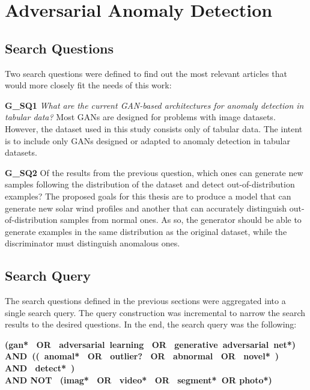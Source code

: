 \section{Adversarial Anomaly Detection}\label{sec:sota_anomaly_detection}

\subsection{Search Questions}\label{sec:gan_search_questions}
Two search questions were defined to find out the most relevant articles that would more closely fit the needs of this work:


\noindent\textbf{G\_SQ1} \textit{What are the current GAN-based architectures for anomaly detection in tabular data?} Most GANs are designed for problems with image datasets. However, the dataset used in this study consists only of tabular data. The intent is to include only GANs designed or adapted to anomaly detection in tabular datasets.

\noindent\textbf{G\_SQ2} Of the results from the previous question, which ones can generate new samples following the distribution of the dataset and detect out-of-distribution examples? The proposed goals for this thesis are to produce a model that can generate new solar wind profiles and another that can accurately distinguish out-of-distribution samples from normal ones. As so, the generator should be able to generate examples in the same distribution as the original dataset, while the discriminator must distinguish anomalous ones.

\subsection{Search Query}\label{sec:gan_search_queries}
The search questions defined in the previous sections were aggregated into a single search query. The query construction was incremental to narrow the search results to the desired questions. In the end, the search query was the following:
\begin{center}
\textbf{(gan*  OR  adversarial learning  OR  generative adversarial net*) \\ AND (( anomal*  OR  outlier?  OR  abnormal  OR  novel* )  AND  detect* ) \\ AND NOT  (imag*  OR  video*  OR  segment* OR photo*)}
\end{center}

